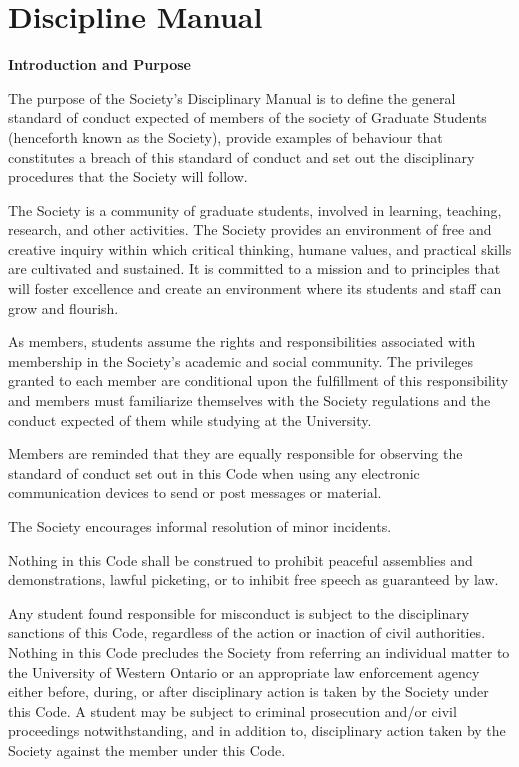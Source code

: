 \section{Discipline Manual}

\begin{longenum}[ label*=\arabic*., align=left]
\item  \textbf{Introduction and Purpose}
\begin{longenum}[ label*=\arabic*., align=left]     
\item  The  purpose  of  the  Society's  Disciplinary  Manual  is  to  define  the  general  standard  of  conduct expected of members of the society of Graduate Students (henceforth known as the Society), provide examples  of  behaviour  that  constitutes  a  breach  of  this  standard  of  conduct  and  set  out  the disciplinary procedures that the Society will follow.
     \item The Society is a community of graduate students, involved in learning, teaching, research, and other activities.  The Society provides  an  environment  of  free  and  creative  inquiry  within  which  critical thinking,  humane  values,  and  practical  skills  are  cultivated  and  sustained.  It  is  committed  to  a mission and to principles that will foster excellence and create an environment where its students and staff can grow and flourish.
     \item  As  members,  students  assume  the  rights  and  responsibilities  associated  with  membership  in the  Society's  academic  and  social  community.  The  privileges  granted  to  each  member  are conditional  upon  the  fulfillment  of  this  responsibility  and  members  must  familiarize  themselves with the Society regulations and the conduct expected of them while studying at the University.
     \item Members are reminded that they are equally responsible for observing the standard of conduct 
set out in this Code when using any electronic communication devices to send or post messages or material.
     \item The Society encourages informal resolution of minor incidents.
     \item   Nothing  in  this  Code  shall  be  construed  to  prohibit  peaceful  assemblies  and  demonstrations, lawful picketing, or to inhibit free speech as guaranteed by law.
     \item Any student found responsible for misconduct is subject to the disciplinary sanctions of this Code,  regardless  of  the  action  or  inaction  of  civil  authorities.  Nothing  in  this  Code  precludes the Society from referring an individual matter to the University of Western Ontario or an appropriate law enforcement agency either before, during, or after disciplinary action is taken by the Society under  this  Code.  A  student  may  be  subject  to  criminal  prosecution  and/or  civil  proceedings notwithstanding, and in addition to, disciplinary action taken by the Society against the member under this Code.

\end{longenum}
\end{longenum}
